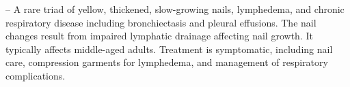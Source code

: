 -- A rare triad of yellow, thickened, slow-growing nails, lymphedema, and chronic respiratory disease including bronchiectasis and pleural effusions. The nail changes result from impaired lymphatic drainage affecting nail growth. It typically affects middle-aged adults. Treatment is symptomatic, including nail care, compression garments for lymphedema, and management of respiratory complications.
